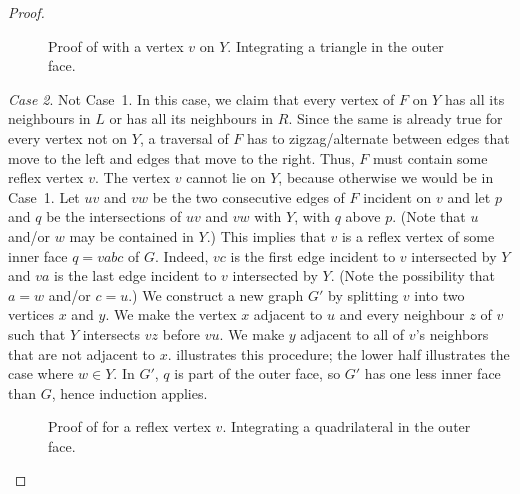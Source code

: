 \begin{proof}
	\begin{figure}[htb]
		\caption{Proof of  with a vertex
			$v$ on $Y$. Integrating a triangle in the outer face.}
	\end{figure}	
	
	{\em Case 2}. Not Case~1. 
%	
%	
	In this case, we claim that every vertex of $F$ on $Y$ has all its neighbours
	in $L$ or has all its neighbours in $R$.  Since the same is already true for every vertex not on $Y$, a traversal of $F$ has to zigzag/alternate between edges that move to the left and edges that move to the right.  Thus, $F$ must contain some reflex vertex $v$.  The vertex $v$ cannot lie on $Y$, because otherwise we would be in Case~1.  Let $uv$ and $vw$ be the two consecutive edges of $F$ incident on $v$ and let $p$ and $q$ be the intersections of $uv$ and $vw$ with $Y$, with $q$ above $p$.	
	(Note that $u$ and/or $w$ may be contained in $Y$.)
	This implies that $v$ is a reflex vertex of some inner face
	$q=vabc$ of $G$.  Indeed, $vc$ is the first edge incident
	to $v$ intersected by $Y$ and $va$ is the last edge incident
	to $v$ intersected by $Y$. (Note the possibility that $a=w$
	and/or $c=u$.)	We construct a new graph $G'$ by splitting
	$v$ into two vertices $x$ and $y$. We make the vertex $x$
	adjacent to $u$ and every neighbour $z$ of $v$ such that $Y$
	intersects $vz$ before $vu$.  We make $y$ adjacent to all of
	$v$'s neighbors that are not adjacent to $x$.  
	illustrates this procedure; the lower half illustrates the case
	where $w\in Y$. In $G'$, $q$ is part of the outer face, so $G'$
	has one less inner face than $G$, hence induction applies.

	\begin{figure}
		\caption{Proof of  for a reflex
			vertex $v$. Integrating a quadrilateral in the outer face.}
	\end{figure}
	

\end{proof}
